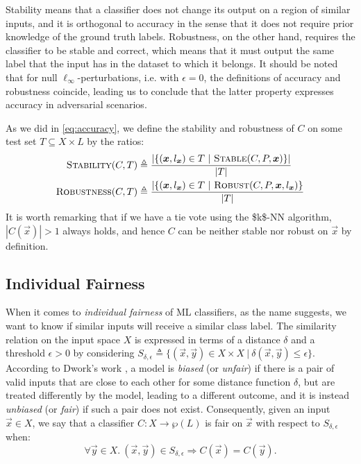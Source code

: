 Stability means that a classifier does not change its output on a region of similar inputs, and it is orthogonal to accuracy in the sense that it does not require prior knowledge of the ground truth labels. Robustness, on the other hand, requires the classifier to be stable and correct, which means that it must output the same label that the input has in the dataset to which it belongs. It should be noted that for null $\ell_\infty$-perturbations, i.e. with $\epsilon = 0$, the definitions of accuracy and robustness coincide, leading us to conclude that the latter property expresses accuracy in adversarial scenarios.

As we did in \eqref{eq:accuracy}, we define the stability and robustness of $C$ on some test set $T \subseteq X \times L$ by the ratios:
\begin{equation}\label{eq:stab-rob}
	\begin{aligned}
		\textsc{Stability}(C, T) &\triangleq \frac{|\{(\vec{x},l_{\vec{x}}) \in T ~|~ \textsc{Stable}(C, P, \vec{x})\}|}{|T|} \\
		\textsc{Robustness}(C, T) &\triangleq \frac{|\{(\vec{x},l_{\vec{x}}) \in T ~|~ \textsc{Robust}(C, P, \vec{x}, l_{\vec{x}})\}}{|T|}
	\end{aligned}
\end{equation}
It is worth remarking that if we have a tie vote using the \acs{$k$-NN} algorithm, $|C(\vec{x})| > 1$ always holds, and hence $C$ can be neither stable nor robust on $\vec{x}$ by definition.


\subsection{Individual Fairness}
\label{subsec:fairness}

When it comes to \emph{individual fairness} of \acs{ML} classifiers, as the name suggests, we want to know if similar inputs will receive a similar class label. The similarity relation on the input space $X$ is expressed in terms of a distance $\delta$ and a threshold $\epsilon>0$  by considering $S_{\delta, \epsilon} \triangleq \{(\vec{x}, \vec{y}) \in X \times X ~|~ \delta(\vec{x}, \vec{y}) \leq \epsilon\}$.  According to Dwork's work \cite{dwork2012fairness}, a model is \emph{biased} (or \emph{unfair}) if there is a pair of valid inputs that are close to each other for some distance function $\delta$, but are treated differently by the model, leading to a different outcome, and it is instead \emph{unbiased} (or \emph{fair}) if such a pair does not exist. Consequently, given an input $\vec{x} \in X$, we say that a classifier $C: X \rightarrow \wp(L)$ is fair on $\vec{x}$ with respect to $S_{\delta, \epsilon}$ when:
\begin{equation*}
	\forall \vec{y} \in X.\: (\vec{x}, \vec{y}) \in S_{\delta, \epsilon} \Rightarrow C(\vec{x}) = C(\vec{y}).
\end{equation*}

